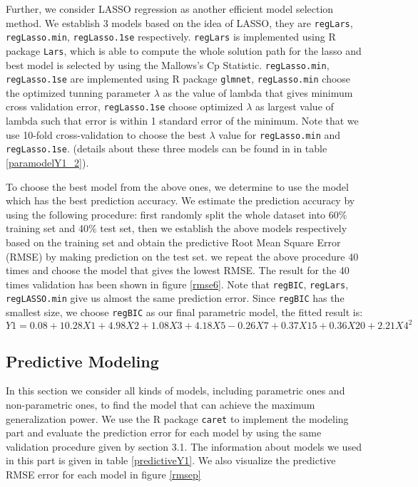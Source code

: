 \documentclass[11pt,oneside,a4paper]{article}
\newcommand{\m}[1]{\texttt{{#1}}}
\begin{document}
Further, we consider LASSO regression as another efficient model selection method. We establish 3 models based on the idea of LASSO, they are \m{regLars}, \m{regLasso.min}, \m{regLasso.1se} respectively. \m{regLars} is implemented using R package \m{Lars}\cite{efron2004least}, which is able to compute the whole solution path for the lasso and best model is selected by using the Mallows's Cp Statistic. \m{regLasso.min}, \m{regLasso.1se} are implemented using R package \m{glmnet}\cite{friedman2009glmnet}, \m{regLasso.min} choose the optimized tunning parameter $\lambda$ as the value of lambda that gives minimum cross validation error, \m{regLasso.1se} choose optimized $\lambda$ as largest value of lambda such that error is within 1 standard error of the minimum. Note that we use 10-fold cross-validation to choose the best $\lambda$ value for \m{regLasso.min} and \m{regLasso.1se}. (details about these three models can be found in in table \ref{paramodelY1_2}).

To choose the best model from the above ones, we determine to use the model which has the best prediction accuracy. We estimate the prediction accuracy by using the following procedure: first randomly split the whole dataset into 60\% training set and 40\% test set, then we establish the above models respectively based on the training set and obtain the predictive Root Mean Square Error (RMSE) by making prediction on the test set. we 
 repeat the above procedure 40 times and choose the model that gives the lowest RMSE. The result for the 40 times validation has been shown in figure \ref{rmse6}. Note that \m{regBIC}, \m{regLars}, \m{regLASSO.min} give us almost the same prediction error. Since \m{regBIC} has the smallest size, we choose \m{regBIC} as our final parametric model, the fitted result is:
$$Y1 = 0.08 + 10.28X1 +  4.98X2 + 1.08X3 + 4.18X5 -0.26X7 + 0.37X15 + 0.36X20 + 2.21{X4}^{2}$$

\subsection{Predictive Modeling}
In this section we consider all kinds of models, including parametric ones and non-parametric ones, to find the model that can achieve the maximum generalization power. We use the R package \m{caret} \cite{kuhn2008building} to implement the modeling part and evaluate the prediction error for each model by using the same validation procedure given by section 3.1. The information about models we used in this part is given in table \ref{predictiveY1}. We also visualize the predictive RMSE error for each model in figure \ref{rmsep}
\end{document}
